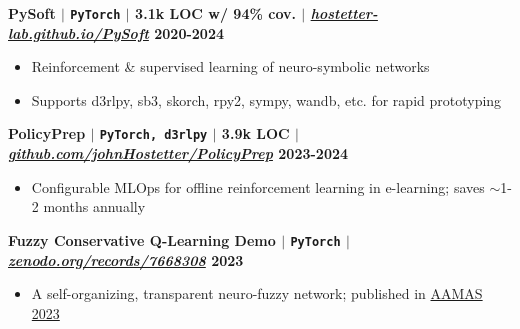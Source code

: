 \documentclass[11pt]{article} %
\begin{document}
\vspace{-4pt}

\noindent\textbf{PySoft\textsuperscript{\dag} $|$ \texttt{PyTorch} $|$ {\normalfont 3.1k LOC w/ 94\% cov.} $|$ \href{https://hostetter-lab.github.io/PySoft}{\normalfont\textit{hostetter-lab.github.io/PySoft}} \hfill 2020-2024}
\vspace{-6pt}
\begin{itemize}
\setlength\itemsep{-0.5em}
  \item Reinforcement \& supervised learning of neuro-symbolic networks
  \item Supports d3rlpy, sb3, skorch, rpy2, sympy, wandb, etc. for rapid prototyping
\end{itemize}

\vspace{-4pt}


\noindent\textbf{PolicyPrep\textsuperscript{\dag} $|$ \texttt{PyTorch, d3rlpy} $|$ {\normalfont 3.9k LOC} $|$ \href{https://github.com/johnHostetter/PolicyPrep}{\normalfont\textit{github.com/johnHostetter/PolicyPrep}} \hfill 2023-2024}
\vspace{-6pt}
\begin{itemize}
\setlength\itemsep{-0.5em}
  \item Configurable MLOps for offline reinforcement learning in e-learning; saves $\sim$1-2 months annually
\end{itemize}

\vspace{-4pt}

\noindent\textbf{Fuzzy Conservative Q-Learning Demo\textsuperscript{\dag} $|$ \texttt{PyTorch} $|$ \href{https://zenodo.org/records/7668308}{\normalfont\textit{zenodo.org/records/7668308}} \hfill 2023}
\vspace{-6pt}
\begin{itemize}
\setlength\itemsep{-0.5em}
    \item A self-organizing, transparent neuro-fuzzy network; published in \href{https://dl.acm.org/doi/10.5555/3545946.3598770}{AAMAS 2023}
\end{itemize}
\end{document}
